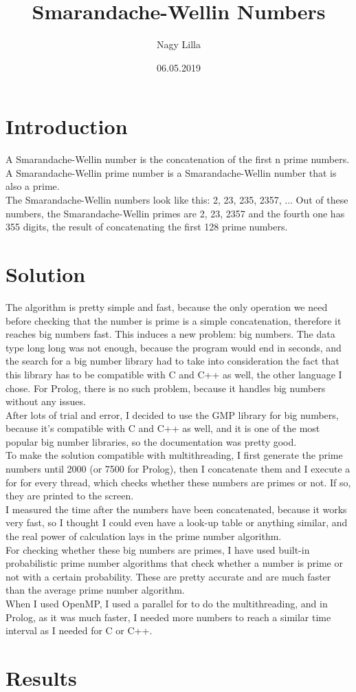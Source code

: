 \documentclass{article}
\title{Smarandache-Wellin Numbers}
\author{Nagy Lilla}
\date{06.05.2019}
\begin{document}
\maketitle

\section{Introduction}

A Smarandache-Wellin number is the concatenation of the first n prime numbers. A Smarandache-Wellin prime number is a Smarandache-Wellin number that is also a prime. \\
The Smarandache-Wellin numbers look like this: 2, 23, 235, 2357, ...
Out of these numbers, the Smarandache-Wellin primes are 2, 23, 2357 and the fourth one has 355 digits, the result of concatenating the first 128 prime numbers.

\section{Solution}

The algorithm is pretty simple and fast, because the only operation we need before checking that the number is prime is a simple concatenation, therefore it reaches big numbers fast. This induces a new problem: big numbers. The data type long long was not enough, because the program would end in seconds, and the search for a big number library had to take into consideration the fact that this library has to be compatible with C and C++ as well, the other language I chose. For Prolog, there is no such problem, because it handles big numbers without any issues. \\
After lots of trial and error, I decided to use the GMP library for big numbers, because it's compatible with C and C++ as well, and it is one of the most popular big number libraries, so the documentation was pretty good. \\
To make the solution compatible with multithreading, I first generate the prime numbers until 2000 (or 7500 for Prolog), then I concatenate them and I execute a for for every thread, which checks whether these numbers are primes or not. If so, they are printed to the screen. \\ 
I measured the time after the numbers have been concatenated, because it works very fast, so I thought I could even have a look-up table or anything similar, and the real power of calculation lays in the prime number algorithm. \\
For checking whether these big numbers are primes, I have used built-in probabilistic prime number algorithms that check whether a number is prime or not with a certain probability. These are pretty accurate and are much faster than the average prime number algorithm. \\
When I used OpenMP, I used a parallel for to do the multithreading, and in Prolog, as it was much faster, I needed more numbers to reach a similar time interval as I needed for C or C++.

\section{Results}
\end{document}
